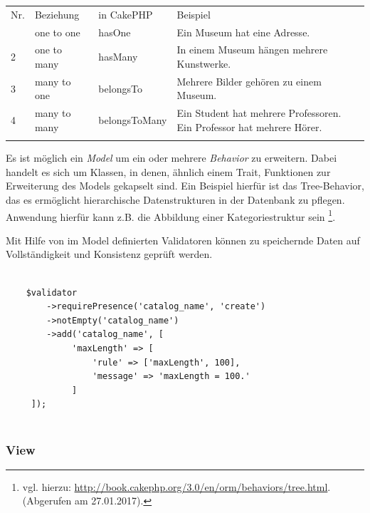 	\begin{table}[!htbp]
		\begin{tabularx}{\textwidth}{p{1cm} X X p{8cm}}
			\cline{2-4}
			\rowcolor[HTML]{EFEFEF} 
			 Nr. & Beziehung & in CakePHP & Beispiel \\ \cline{1-4} \addlinespace
			1 & one to one & hasOne & Ein Museum hat eine Adresse. \\
			2 & one to many & hasMany & In einem Museum hängen mehrere Kunstwerke. \\
			3 & many to one & belongsTo & Mehrere Bilder gehören zu einem Museum. \\  
			4 & many to many & belongsToMany & Ein Student hat mehrere Professoren. Ein Professor hat mehrere Hörer. \\ \addlinespace \cline{1-4}     
		\end{tabularx}
	\end{table}
		
	
	
	
	Es ist möglich ein \textit{Model} um ein oder mehrere \textit{Behavior} zu erweitern. Dabei handelt es sich um Klassen, in denen, ähnlich einem Trait, Funktionen zur Erweiterung des Models gekapselt sind. Ein Beispiel hierfür ist das Tree-Behavior, das es ermöglicht hierarchische Datenstrukturen in der Datenbank zu pflegen. Anwendung hierfür kann z.B. die Abbildung einer Kategoriestruktur sein \footnote{vgl. hierzu: \url{http://book.cakephp.org/3.0/en/orm/behaviors/tree.html}. (Abgerufen am 27.01.2017).}. 
	
	Mit Hilfe von im Model definierten Validatoren können zu speichernde Daten auf Vollständigkeit und Konsistenz geprüft werden. 

	\lstset{language=PHP}
	\begin{lstlisting}[caption={Validator in CakePHP}] 

	$validator
     	->requirePresence('catalog_name', 'create')
     	->notEmpty('catalog_name')
     	->add('catalog_name', [
	         'maxLength' => [
	             'rule' => ['maxLength', 100],
	             'message' => 'maxLength = 100.'
	         ]
     ]);
	
	\end{lstlisting}
	
	\subsubsection{View}
	
